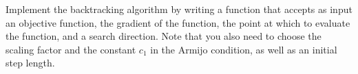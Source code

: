 \begin{problem}
Implement the backtracking algorithm by writing a function that accepts as input an 
objective function, the gradient of the function, the point at which to evaluate the 
function, and a search direction. Note that you also need to choose the scaling factor 
and the constant $c_1$ in the Armijo condition, as well as an initial step length.
\end{problem}



